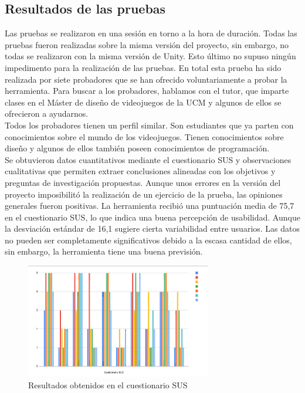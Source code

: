 \subsection{Resultados de las pruebas}
Las pruebas se realizaron en una sesión en torno a la hora de duración. Todas las pruebas fueron realizadas sobre la misma versión del proyecto, sin embargo, no todas se realizaron con la misma versión de Unity. Esto último no supuso ningún impedimento para la realización de las pruebas. 
En total esta prueba ha sido realizada por siete probadores que se han ofrecido voluntariamente a probar la herramienta. Para buscar a los probadores, hablamos con el tutor, que imparte clases en el Máster de diseño de videojuegos de la UCM y algunos de ellos se ofrecieron a ayudarnos. \\

Todos los probadores tienen un perfil similar. Son estudiantes que ya parten con conocimientos sobre el mundo de los videojuegos. Tienen conocimientos sobre diseño y algunos de ellos también poseen conocimientos de programación. \\

Se obtuvieron datos cuantitativos mediante el cuestionario SUS y observaciones cualitativas que permiten extraer conclusiones alineadas con los objetivos y preguntas de investigación propuestas. Aunque unos errores en la versión del proyecto imposibilitó la realización de un ejercicio de la prueba, las opiniones generales fueron positivas. La herramienta recibió una puntuación media de 75,7 en el cuestionario SUS, lo que indica una buena percepción de usabilidad. Aunque la desviación estándar de 16,1 sugiere cierta variabilidad entre usuarios. Las datos no pueden ser completamente significativos debido a la escasa cantidad de ellos, sin embargo, la herramienta tiene una buena previsión.\\

\begin{figure}[t]
	\centering
	\includegraphics[height=5cm]{Imagenes/ResultadosSUS.png}
	\caption{Resultados obtenidos en el cuestionario SUS}
	\label{fig:Cuestionario SUS}
\end{figure}

